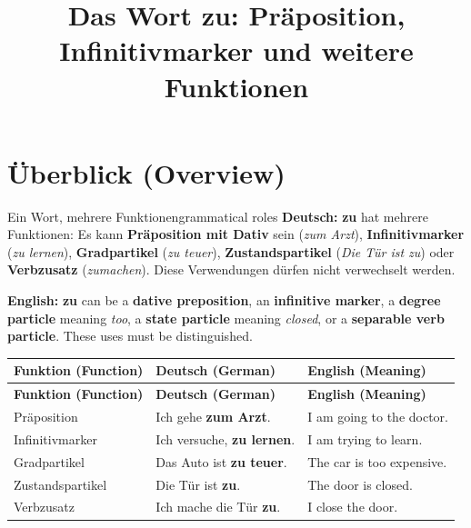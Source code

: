 \documentclass[a4paper,11pt]{article}
\title{Das Wort \glqq zu\grqq{}: Präposition, Infinitivmarker und weitere Funktionen}
\date{}
\newcommand{\GermanText}[1]{\textbf{Deutsch: }#1\par}
\newcommand{\EnglishText}[1]{{\small\color{SoftGray}\textbf{English: }#1\par}}
\newcommand{\TableHead}[1]{\color{white}\textbf{#1}}
\begin{document}
\maketitle
\tableofcontents
\newpage

\section{Überblick (Overview)}
\begin{grammarentry}{Ein Wort, mehrere Funktionen}{grammatical roles}
\GermanText{\textbf{zu} hat mehrere Funktionen: Es kann \textbf{Präposition mit Dativ} sein (\emph{zum Arzt}), \textbf{Infinitivmarker} (\emph{zu lernen}), \textbf{Gradpartikel} (\emph{zu teuer}), \textbf{Zustandspartikel} (\emph{Die Tür ist zu}) oder \textbf{Verbzusatz} (\emph{zumachen}). Diese Verwendungen dürfen nicht verwechselt werden.}
\EnglishText{\textbf{zu} can be a \textbf{dative preposition}, an \textbf{infinitive marker}, a \textbf{degree particle} meaning \emph{too}, a \textbf{state particle} meaning \emph{closed}, or a \textbf{separable verb particle}. These uses must be distinguished.}
\end{grammarentry}
\begin{longtable}{>{\raggedright\arraybackslash}p{3.7cm}>{\raggedright\arraybackslash}p{5.45cm}>{\raggedright\arraybackslash}p{5.65cm}}
\rowcolor{HeaderBlueDark}\TableHead{Funktion (Function)} & \TableHead{Deutsch (German)} & \TableHead{English (Meaning)}\\
\endfirsthead
\rowcolor{HeaderBlueDark}\TableHead{Funktion (Function)} & \TableHead{Deutsch (German)} & \TableHead{English (Meaning)}\\
\endhead
Präposition & Ich gehe \textbf{zum Arzt}. & I am going to the doctor.\\
Infinitivmarker & Ich versuche, \textbf{zu lernen}. & I am trying to learn.\\
Gradpartikel & Das Auto ist \textbf{zu teuer}. & The car is too expensive.\\
Zustandspartikel & Die Tür ist \textbf{zu}. & The door is closed.\\
Verbzusatz & Ich mache die Tür \textbf{zu}. & I close the door.\\
\end{longtable}
\end{document}

